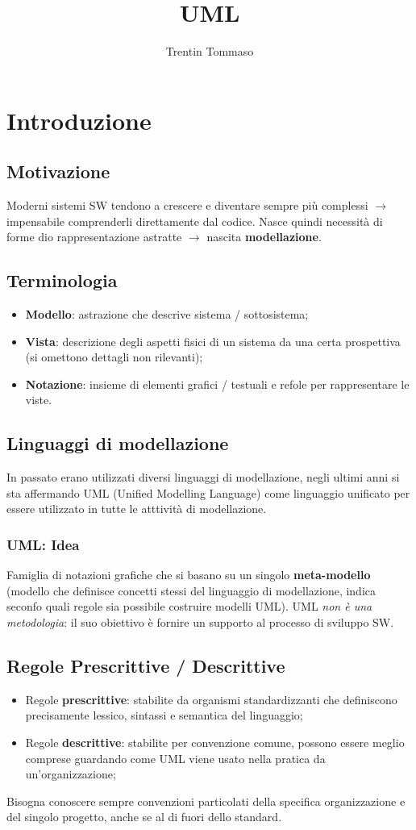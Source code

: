 \documentclass{article}
\title{UML}
\author{Trentin Tommaso}
\begin{document}
  \section{Introduzione}
    \subsection{Motivazione}
      Moderni sistemi SW tendono a crescere e diventare sempre più complessi $\rightarrow$ impensabile comprenderli direttamente dal codice. Nasce quindi necessità di forme dio rappresentazione astratte $\rightarrow$ nascita \textbf{modellazione}.  
    \subsection{Terminologia}
      \begin{itemize}
        \item \textbf{Modello}: astrazione che descrive sistema / sottosistema;
        \item \textbf{Vista}: descrizione degli aspetti fisici di un sistema da una certa prospettiva (si omettono dettagli non rilevanti);
        \item \textbf{Notazione}: insieme di elementi grafici / testuali e refole per rappresentare le viste.
      \end{itemize}
    \subsection{Linguaggi di modellazione}
      In passato erano utilizzati diversi linguaggi di modellazione, negli ultimi anni si sta affermando UML (Unified Modelling Language) come linguaggio unificato per essere utilizzato in tutte le atttività di modellazione. 
      \subsubsection{UML: Idea}
        Famiglia di notazioni grafiche che si basano su un singolo \textbf{meta-modello} (modello che definisce concetti stessi del linguaggio di modellazione, indica seconfo quali regole sia possibile costruire modelli UML). UML \textit{non è una metodologia}: il suo obiettivo è fornire un supporto al processo di sviluppo SW. 
    \subsection{Regole Prescrittive / Descrittive}
      \begin{itemize}
        \item Regole \textbf{prescrittive}: stabilite da organismi standardizzanti che definiscono precisamente lessico, sintassi e semantica del linguaggio;
        \item Regole \textbf{descrittive}: stabilite per convenzione comune, possono essere meglio comprese guardando come UML viene usato nella pratica da un'organizzazione;
      \end{itemize}
      Bisogna conoscere sempre convenzioni particolati della specifica organizzazione e del singolo progetto, anche se al di fuori dello standard.
\end{document}
